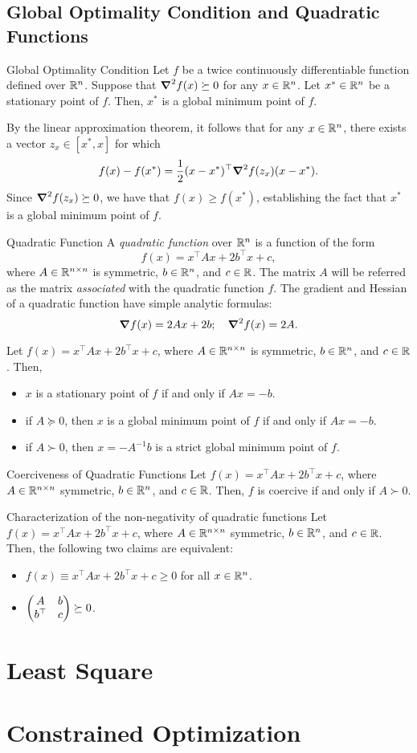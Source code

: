 \subsection{Global Optimality Condition and Quadratic Functions}
\begin{thm}{Global Optimality Condition}
	Let $f$ be a twice continuously differentiable function defined over ${\mathbb{R}}^n$. Suppose that $\grad^2f(x)\succeq0$ for any $x\in{\mathbb{R}}^n$. Let $x^*\in{\mathbb{R}}^n$ be a stationary point of $f$. Then, $x^*$ is a global minimum point of $f$. 
\end{thm}
\begin{prf}
	By the linear approximation theorem, it follows that for any $x\in{\mathbb{R}}^n$, there exists a vector $z_x\in[x^*,x]$ for which \[f(x)-f(x^*)=\dfrac{1}{2}(x-x^*)^\top\grad^2f(z_x)(x-x^*).\] Since $\grad^2f(z_x)\succeq0$, we have that $f(x)\geq f(x^*)$, establishing the fact that $x^*$ is a global minimum point of $f$. 
\end{prf}
\begin{df}{Quadratic Function}
	A \textit{quadratic function} over ${\mathbb{R}}^n$ is a function of the form \[f(x)=x^\top Ax+2b^\top x+c,\] where $A\in{\mathbb{R}}^{n\times n}$ is symmetric, $b\in{\mathbb{R}}^n$, and $c\in{\mathbb{R}}$. The matrix $A$ will be referred as the matrix \textit{associated} with the quadratic function $f$. The gradient and Hessian of a quadratic function have simple analytic formulas: \[\grad f(x)=2Ax+2b;\quad\grad^2f(x)=2A.\]
\end{df}
\begin{lem}{}
	Let	$f(x)=x^\top Ax+2b^\top x+c$, where $A\in{\mathbb{R}}^{n\times n}$ is symmetric, $b\in{\mathbb{R}}^n$, and $c\in{\mathbb{R}}$. Then, 
	\begin{itemize}
		\item $x$ is a stationary point of $f$ if and only if $Ax=-b$.
		\item if $A\succeq0$, then $x$ is a global minimum point of $f$ if and only if $Ax=-b$.
		\item if $A\succ0$, then $x=-A^{-1}b$ is a strict global minimum point of $f$.
	\end{itemize}
\end{lem}
\begin{lem}{Coerciveness of Quadratic Functions}
	Let $f(x)=x^\top Ax+2b^\top x+c$, where $A\in{\mathbb{R}}^{n\times n}$ symmetric, $b\in{\mathbb{R}}^n$, and $c\in{\mathbb{R}}$. Then, $f$ is coercive if and only if $A\succ0$.
\end{lem}
\begin{thm}{Characterization of the non-negativity of quadratic functions}
	Let $f(x)=x^\top Ax+2b^\top x+c$, where $A\in{\mathbb{R}}^{n\times n}$ symmetric, $b\in{\mathbb{R}}^n$, and $c\in{\mathbb{R}}$. Then, the following two claims are equivalent: 
	\begin{itemize}
		\item $f(x)\equiv x^\top Ax+2b^\top x+c\geq0$ for all $x\in{\mathbb{R}}^n$.
		\item $\mqty(A&b\\b^\top&c)\succeq0$.
	\end{itemize}
\end{thm}

\newpage
\section{Least Square}

\newpage
\section{Constrained Optimization}

